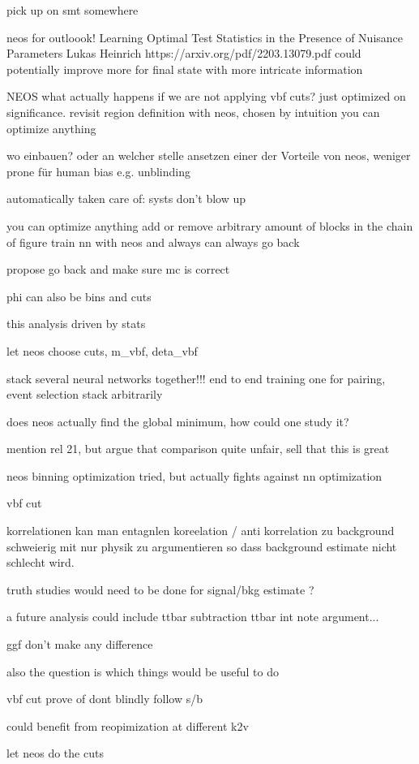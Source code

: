 
pick up on smt somewhere


neos
for outloook!
Learning Optimal Test Statistics in the Presence of
Nuisance Parameters
Lukas Heinrich
https://arxiv.org/pdf/2203.13079.pdf 
could potentially improve more for final state with more intricate information

NEOS
what actually happens if we are not applying vbf cuts? just optimized on significance.
revisit region definition with neos, chosen by intuition 
you can optimize anything 

wo einbauen? oder an welcher stelle ansetzen
einer der Vorteile von neos, weniger prone für human bias e.g. unblinding

automatically taken care of: systs don't blow up

you can optimize anything
add or remove arbitrary amount of blocks in the chain of figure 
train nn with neos and always can always go back

propose go back and make sure mc is correct

phi can also be bins and cuts

this analysis driven by stats

let neos choose cuts,
m_vbf, deta_vbf


stack several neural networks together!!! end to end training 
one for pairing, event selection 
stack arbitrarily 

does neos actually find the global minimum, how could one study it?


mention rel 21, but argue that comparison quite unfair, sell that this is great


neos
binning optimization tried, but actually fights against nn optimization


vbf cut

korrelationen kan man entagnlen
koreelation / anti korrelation zu background schweierig mit nur physik zu argumentieren 
so dass background estimate nicht schlecht wird.

truth studies would need to be done for signal/bkg estimate ? 

a future analysis could include ttbar subtraction
ttbar int note argument...

ggf don't make any difference 

also the question is which things would be useful to do 


vbf cut prove of dont blindly follow s/b

could benefit from reopimization at different k2v

let neos do the cuts 